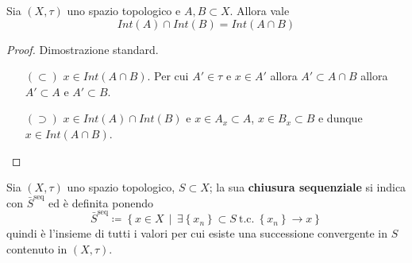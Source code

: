 \begin{proposition}
	Sia $(X,\tau)$ uno spazio topologico e $A, B \subset X$. Allora vale 
	\begin{equation*}
		Int(A) \cap Int(B) = Int(A \cap B)
	\end{equation*}
\end{proposition}
\begin{proof}
	Dimostrazione standard.
	\begin{enumerate}
		\item[$(\subset)$]  $x \in Int(A \cap B)$. Per cui $A' \in \tau$ e $x \in A'$ allora $A' \subset A \cap B$ allora $A' \subset A$ e $A' \subset B$.  
		\item[$(\supset)$] $x \in Int(A) \cap Int(B)$ e $x \in A_x \subset A$, $x \in B_x \subset B$ e dunque $x \in Int(A \cap B)$.
	\end{enumerate}
\end{proof}


\begin{definition}
	Sia $(X,\tau)$ uno spazio topologico, $S \subset X$; la sua \textbf{chiusura sequenziale} si indica con $\bar{S}^\text{seq}$ ed è definita ponendo
	\begin{equation*}
		\bar{S}^\text{seq} \coloneqq \left\{x \in X \,\middle|\, \exists\left\{x_n\right\} \subset S\ \text{t.c.}\ \left\{x_n\right\} \rightarrow x \right\}
	\end{equation*}
	quindi è l'insieme di tutti i valori per cui esiste una successione convergente in $S$ contenuto in $(X, \tau)$.
\end{definition}

